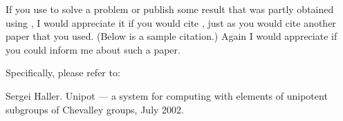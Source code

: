
If you  use {\Unipot} to solve a problem or publish some  result
that was partly obtained  using {\Unipot}, I would appreciate it
if you would  cite {\Unipot},  just  as you  would  cite another
paper that you used. (Below is a sample citation.) Again I would
appreciate if you could inform me about such a paper.

Specifically, please refer to:
 
\begintt
[Hal02] Sergei Haller. Unipot --- a system for computing with elements
        of unipotent subgroups of Chevalley groups, July 2002.
\endtt
 






